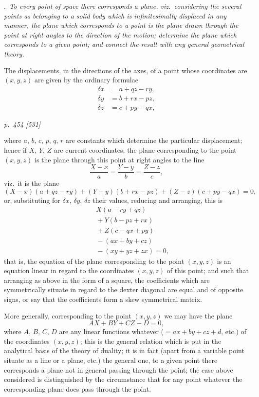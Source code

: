 \documentclass[11pt,a4paper]{book}
\begin{document}
\medskip
{}.\ \textit{To every point of space there corresponds a plane, viz.\ considering the several
points as belonging to a solid body which is infinitesimally displaced in any manner,
the plane which corresponds to a point is the plane drawn through the point at right
angles to the direction of the motion; determine the plane which corresponds to a given
point; and connect the result with any general geometrical theory.}

\medskip
The displacements, in the directions of the axes, of a point whose coordinates are
$(x, y, z)$ are given by the ordinary formulae
\begin{align*}
\delta x &= a + q z - r y, \\
\delta y &= b + r x - p z, \\
\delta z &= c + p y - q x,
\end{align*}

\clearpage

\bigskip
\textit{p.~454 [531]}
\smallskip

\noindent
where $a$, $b$, $c$, $p$, $q$, $r$ are constants which determine the particular displacement; hence if $X$, $Y$, $Z$ are current coordinates, the plane corresponding to the point $(x, y, z)$ is
the plane through this point at right angles to the line
\[
\frac{X - x}{a} = \frac{Y - y}{b} = \frac{Z - z}{c},
\]
viz.\ it is the plane
\[
(X - x) (a + qz - ry) + (Y - y) (b + rx - pz) + (Z - z) (c + py - qx) = 0,
\]
or, substituting for $\delta x$, $\delta y$, $\delta z$ their values, reducing and arranging, this is
\begin{align*}
&\quad X(a - r y + q z) \\
&\quad + Y(b - p z + r x) \\
&\quad + Z(c - q x + p y) \\
&\quad - (ax + by + cz) \\
&\quad - (xy + yz + zx) = 0,
\end{align*}
that is, the equation of the plane corresponding to the point $(x, y, z)$ is an equation
linear in regard to the coordinates $(x, y, z)$ of this point; and such that arranging as
above in the form of a square, the coefficients which are symmetrically situate in
regard to the dexter diagonal are equal and of opposite signs, or say that the
coefficients form a skew symmetrical matrix.

More generally, corresponding to the point $(x, y, z)$ we may have the plane
\[
AX + BY + CZ + D = 0,
\]
where $A$, $B$, $C$, $D$ are any linear functions whatever ($= ax + by + cz + d$, etc.) of the
coordinates $(x, y, z)$; this is the general relation which is put in the analytical basis of the
theory of duality; it is in fact (apart from a variable point situate as a
line or a plane, etc.) the general one, to a given point there corresponds a
plane not in general passing through the point; the case above considered is distinguished by the circumstance that for any point whatever the corresponding plane does
pass through the point.
\end{document}
